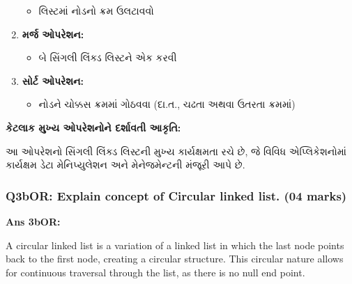 \begin{enumerate}
  \begin{itemize}
  \tightlist
  \item
    લિસ્ટમાં નોડનો ક્રમ ઉલટાવવો
  \end{itemize}
\item
  \textbf{મર્જ ઓપરેશન:}

  \begin{itemize}
  \tightlist
  \item
    બે સિંગલી લિંક્ડ લિસ્ટને એક કરવી
  \end{itemize}
\item
  \textbf{સોર્ટ ઓપરેશન:}

  \begin{itemize}
  \tightlist
  \item
    નોડને ચોક્કસ ક્રમમાં ગોઠવવા (દા.ત., ચઢતા અથવા ઉતરતા ક્રમમાં)
  \end{itemize}
\end{enumerate}

\textbf{કેટલાક મુખ્ય ઓપરેશનોને દર્શાવતી આકૃતિ:}

\begin{Shaded}
\begin{Highlighting}[]
\end{Highlighting}
\end{Shaded}

આ ઓપરેશનો સિંગલી લિંક્ડ લિસ્ટની મુખ્ય કાર્યક્ષમતા રચે છે, જે વિવિધ એપ્લિકેશનોમાં
કાર્યક્ષમ ડેટા મેનિપ્યુલેશન અને મેનેજમેન્ટની મંજૂરી આપે છે.

\hypertarget{q3bor-explain-concept-of-circular-linked-list.-04-marks}{%
\subsubsection{Q3bOR: Explain concept of Circular linked list. (04
marks)}\label{q3bor-explain-concept-of-circular-linked-list.-04-marks}}

\textbf{Ans 3bOR:}

A circular linked list is a variation of a linked list in which the last
node points back to the first node, creating a circular structure. This
circular nature allows for continuous traversal through the list, as
there is no null end point.

